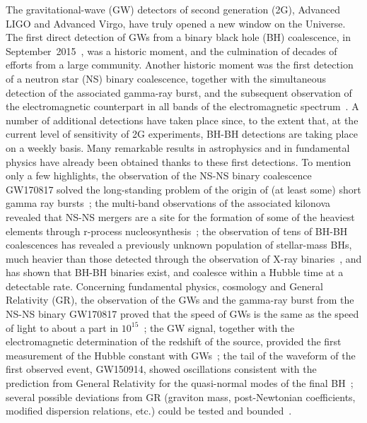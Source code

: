 The gravitational-wave (GW) detectors of second generation (2G), Advanced LIGO and Advanced Virgo, have truly opened a new window on the Universe. The first direct detection of GWs from a binary black hole (BH) coalescence, in September~2015~\cite{Abbott:2016blz},  was a historic moment, and the culmination of decades of efforts from a large community. Another historic moment was the first detection of a neutron star (NS) binary coalescence, together with the simultaneous detection of the associated gamma-ray burst, and the subsequent observation of the electromagnetic counterpart in all bands of the electromagnetic 
spectrum~\cite{TheLIGOScientific:2017qsa,Goldstein:2017mmi,Savchenko:2017ffs,Monitor:2017mdv,GBM:2017lvd,Coulter:2017,Troja:2017,Hallinan:2017}. A number of additional detections have taken place since,  to the extent that, at the current level of sensitivity of 2G experiments, BH-BH detections are taking place on a weekly basis.
Many remarkable results in astrophysics and in fundamental physics have already been obtained thanks to these first detections. To mention only a few highlights,  the observation of the NS-NS binary coalescence GW170817 solved the long-standing problem of the origin of (at least some) short gamma ray bursts~\cite{TheLIGOScientific:2017qsa,Mooley:2018,Ghirlanda:2019}; the multi-band observations of the associated kilonova revealed that NS-NS mergers are a site for  the  formation of some of the heaviest elements through r-process nucleosynthesis~\cite{Pian:2017,Smartt:2017,Kasen:2017,Watson:2019}; the observation of tens of BH-BH coalescences has  revealed a previously unknown population of stellar-mass BHs, much heavier than those detected through the observation of X-ray binaries~\cite{LIGOScientific:2018mvr}, and has shown that BH-BH binaries exist, and coalesce within a Hubble time at a detectable rate.  Concerning  fundamental physics, cosmology and General Relativity (GR), the observation of the GWs and the gamma-ray burst from the NS-NS binary GW170817 proved that the speed of GWs is the same as the speed of light to about a part in $10^{15}$~\cite{Monitor:2017mdv}; the GW signal, together with the electromagnetic determination of the redshift of the source, provided the first measurement of the Hubble constant with GWs~\cite{Abbott:2017xzu};  the tail of the waveform of the first observed event, GW150914, showed  oscillations consistent with the prediction from General Relativity  for the quasi-normal modes of the final BH~\cite{TheLIGOScientific:2016src}; several  possible deviations from GR (graviton mass, post-Newtonian coefficients, modified dispersion relations, etc.) could be tested and bounded~\cite{TheLIGOScientific:2016src,Abbott:2018lct,LIGOScientific:2019fpa}.

